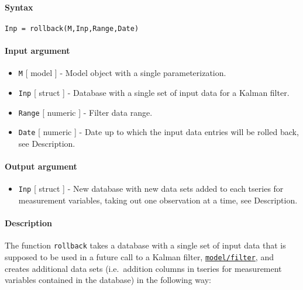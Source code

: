 


	\paragraph{Syntax}\label{syntax}

\begin{verbatim}
Inp = rollback(M,Inp,Range,Date)
\end{verbatim}

\paragraph{Input argument}\label{input-argument}

\begin{itemize}
\item
  \texttt{M} {[} model {]} - Model object with a single
  parameterization.
\item
  \texttt{Inp} {[} struct {]} - Database with a single set of input data
  for a Kalman filter.
\item
  \texttt{Range} {[} numeric {]} - Filter data range.
\item
  \texttt{Date} {[} numeric {]} - Date up to which the input data
  entries will be rolled back, see Description.
\end{itemize}

\paragraph{Output argument}\label{output-argument}

\begin{itemize}
\itemsep1pt\parskip0pt
\item
  \texttt{Inp} {[} struct {]} - New database with new data sets added to
  each tseries for measurement variables, taking out one observation at
  a time, see Description.
\end{itemize}

\paragraph{Description}\label{description}

The function \texttt{rollback} takes a database with a single set of
input data that is supposed to be used in a future call to a Kalman
filter, \href{model/filter}{\texttt{model/filter}}, and creates
additional data sets (i.e.~addition columns in tseries for measurement
variables contained in the database) in the following way:

